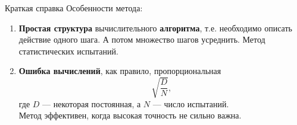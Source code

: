 \documentclass{beamer}
\begin{document}
	\begin{frame}{Краткая справка}
		Особенности метода:
		\begin{enumerate}
			\item 
			\textbf{Простая структура} вычислительного \textbf{алгоритма}, т.е. необходимо описать действие одного шага.
			А потом множество шагов усреднить.
			Метод статистических испытаний.
			\item
			\textbf{Ошибка вычислений}, как правило, пропорциональная 
			$$\sqrt{\frac{D}{N}},$$ 
			где $D$ --- некоторая постоянная, а $N$ --- число испытаний.
			\\
			Метод эффективен, когда высокая точность не сильно важна.
			
		\end{enumerate}
		
	\end{frame}
\end{document}
